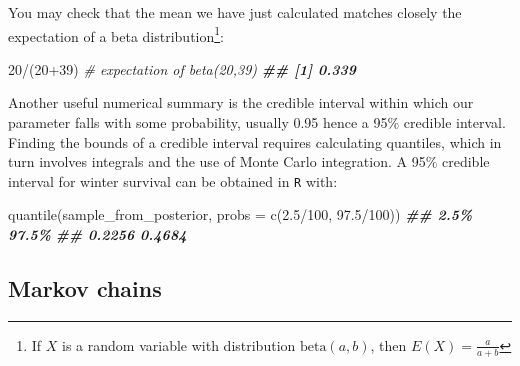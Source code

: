 \documentclass[
  12pt,
]{krantz}
\newenvironment{Shaded}{\begin{snugshade}}{\end{snugshade}}
\newcommand{\AttributeTok}[1]{\textcolor[rgb]{0.77,0.63,0.00}{#1}}
\newcommand{\CommentTok}[1]{\textcolor[rgb]{0.56,0.35,0.01}{\textit{#1}}}
\newcommand{\DecValTok}[1]{\textcolor[rgb]{0.00,0.00,0.81}{#1}}
\newcommand{\DocumentationTok}[1]{\textcolor[rgb]{0.56,0.35,0.01}{\textbf{\textit{#1}}}}
\newcommand{\FloatTok}[1]{\textcolor[rgb]{0.00,0.00,0.81}{#1}}
\newcommand{\FunctionTok}[1]{\textcolor[rgb]{0.00,0.00,0.00}{#1}}
\newcommand{\NormalTok}[1]{#1}
\newcommand{\SpecialCharTok}[1]{\textcolor[rgb]{0.00,0.00,0.00}{#1}}
\begin{document}
You may check that the mean we have just calculated matches closely the expectation of a beta distribution\footnote{If \(X\) is a random variable with distribution \(\text{beta}(a, b)\), then \(E(X) = \displaystyle{\frac{a}{a + b}}\)}:

\begin{Shaded}
\begin{Highlighting}[]
\DecValTok{20}\SpecialCharTok{/}\NormalTok{(}\DecValTok{20}\SpecialCharTok{+}\DecValTok{39}\NormalTok{) }\CommentTok{\# expectation of beta(20,39)}
\DocumentationTok{\#\# [1] 0.339}
\end{Highlighting}
\end{Shaded}

Another useful numerical summary is the credible interval within which our parameter falls with some probability, usually 0.95 hence a 95\(\%\) credible interval. Finding the bounds of a credible interval requires calculating quantiles, which in turn involves integrals and the use of Monte Carlo integration. A 95\(\%\) credible interval for winter survival can be obtained in \texttt{R} with:

\begin{Shaded}
\begin{Highlighting}[]
\FunctionTok{quantile}\NormalTok{(sample\_from\_posterior, }\AttributeTok{probs =} \FunctionTok{c}\NormalTok{(}\FloatTok{2.5}\SpecialCharTok{/}\DecValTok{100}\NormalTok{, }\FloatTok{97.5}\SpecialCharTok{/}\DecValTok{100}\NormalTok{))}
\DocumentationTok{\#\#   2.5\%  97.5\% }
\DocumentationTok{\#\# 0.2256 0.4684}
\end{Highlighting}
\end{Shaded}

\hypertarget{markovmodelmcmc}{%
\subsection{Markov chains}\label{markovmodelmcmc}}
\end{document}
